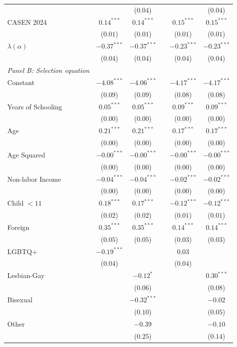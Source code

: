 \begin{table}[H]
\begin{center}
\begin{threeparttable}
\begin{tabular}{lccccc}
 & & ($0.04$) & & & ($0.04$) \\ 
CASEN 2024 & $0.14^{***}$& $0.14^{***}$ & & $0.15^{***}$& $0.15^{***}$ \\ 
 & ($0.01$)& ($0.01$) & & ($0.01$)& ($0.01$) \\ 
$\lambda(\alpha)$ & $-0.37^{***}$& $-0.37^{***}$ & & $-0.23^{***}$& $-0.23^{***}$ \\ 
 & ($0.04$)& ($0.04$) & & ($0.04$)& ($0.04$) \\ 
\midrule
\textit{Panel B: Selection equation} &  & &  &  &  \\ 
Constant & $-4.08^{***}$& $-4.06^{***}$ & & $-4.17^{***}$& $-4.17^{***}$ \\ 
 & ($0.09$)& ($0.09$) & & ($0.08$)& ($0.08$) \\ 
Years of Schooling & $0.05^{***}$& $0.05^{***}$ & & $0.09^{***}$& $0.09^{***}$ \\ 
 & ($0.00$)& ($0.00$) & & ($0.00$)& ($0.00$) \\ 
Age & $0.21^{***}$& $0.21^{***}$ & & $0.17^{***}$& $0.17^{***}$ \\ 
 & ($0.00$)& ($0.00$) & & ($0.00$)& ($0.00$) \\ 
Age Squared & $-0.00^{***}$& $-0.00^{***}$ & & $-0.00^{***}$& $-0.00^{***}$ \\ 
 & ($0.00$)& ($0.00$) & & ($0.00$)& ($0.00$) \\ 
Non-labor Income & $-0.04^{***}$& $-0.04^{***}$ & & $-0.02^{***}$& $-0.02^{***}$ \\ 
 & ($0.00$)& ($0.00$) & & ($0.00$)& ($0.00$) \\ 
Child $< 11$ & $0.18^{***}$& $0.17^{***}$ & & $-0.12^{***}$& $-0.12^{***}$ \\ 
 & ($0.02$)& ($0.02$) & & ($0.01$)& ($0.01$) \\ 
Foreign & $0.35^{***}$& $0.35^{***}$ & & $0.14^{***}$& $0.14^{***}$ \\ 
 & ($0.05$)& ($0.05$) & & ($0.03$)& ($0.03$) \\ 
LGBTQ+ & $-0.19^{***}$&  & & $0.03$&  \\ 
 & ($0.04$)&  & & ($0.04$)&  \\ 
Lesbian-Gay & & $-0.12^{*}$ & & & $0.30^{***}$ \\ 
 & & ($0.06$) & & & ($0.08$) \\ 
Bisexual & & $-0.32^{***}$ & & & $-0.02$ \\ 
 & & ($0.10$) & & & ($0.05$) \\ 
Other & & $-0.39$ & & & $-0.10$ \\ 
 & & ($0.25$) & & & ($0.14$) \\ 

\end{tabular}
\end{threeparttable}
\end{center}
\end{table}
